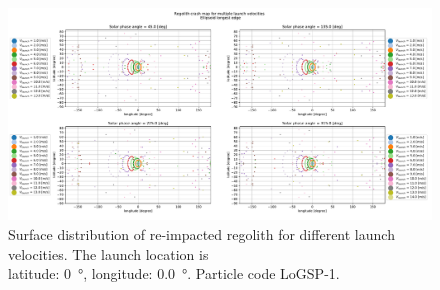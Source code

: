 \begin{figure}[htb]
\centering
\captionsetup{justification=centering}
\includegraphics[angle=90, width=\textwidth, height=\textheight, keepaspectratio=true]{longest_edge_perturbations/3.2Density_1cmSize/crash_map_all_solar_phases.pdf}
\caption{Surface distribution of re-impacted regolith for different launch velocities. The launch location is \\ latitude: \SI{0}{\degree}, longitude: \SI{0.0}{\degree}. Particle code LoGSP-1.}
\label{fig:LoGSP_1_crashmap}
\end{figure}
\FloatBarrier


